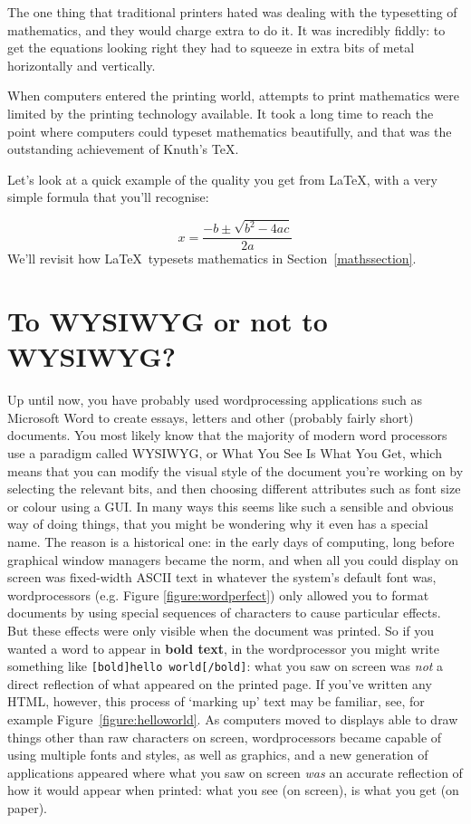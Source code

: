 \begin{refsection}
The one thing that traditional printers hated was dealing with the typesetting of mathematics, and they would charge extra to do it. It was incredibly fiddly: to get the equations looking right they had to squeeze in extra bits of metal horizontally and vertically. 

When computers entered the printing world, attempts to print mathematics were limited by the printing technology available. It took a long time to reach the point where computers could typeset mathematics beautifully, and that was the outstanding achievement of Knuth's \TeX.

Let's look at a quick example of the quality you get from \LaTeX, with a very simple formula that you'll recognise:

\[ x = \frac{-b \pm \sqrt{b^2-4ac}}{2a} \]
%
We'll revisit how \LaTeX\ typesets mathematics in Section~\ref{mathssection}.

\section{To WYSIWYG or not to WYSIWYG?}
Up until now, you have probably used wordprocessing applications such as Microsoft Word to create essays, letters and other (probably fairly short) documents. You most likely know that the majority of modern word processors use a paradigm called WYSIWYG, or What You See Is What You Get, which means that you can modify the visual style of the document you're working on by selecting the relevant bits, and then choosing different attributes such as font size or colour using a GUI. In many ways this seems like such a sensible and obvious way of doing things, that you might be wondering why it even has a special name. The reason is a historical one: in the early days of computing, long before graphical window managers became the norm, and when all you could display on screen was fixed-width ASCII text in whatever the system's default font was, wordprocessors (e.g. Figure \ref{figure:wordperfect}) only allowed you to format documents by using special sequences of characters to cause particular effects. But these effects were only visible when the document was printed. So if you wanted a word to appear in \textbf{bold text}, in the wordprocessor you might write something like \texttt{[bold]hello world[/bold]}: what you saw on screen was \emph{not} a direct reflection of what appeared on the printed page. If you've written any HTML, however, this process of `marking up' text may be familiar, see, for example Figure~\ref{figure:helloworld}. As computers moved to displays able to draw things other than raw characters on screen, wordprocessors became capable of using multiple fonts and styles, as well as graphics, and a new generation of applications appeared where what you saw on screen \emph{was} an accurate reflection of how it would appear when printed: what you see (on screen), is what you get (on paper). 


\end{refsection}
